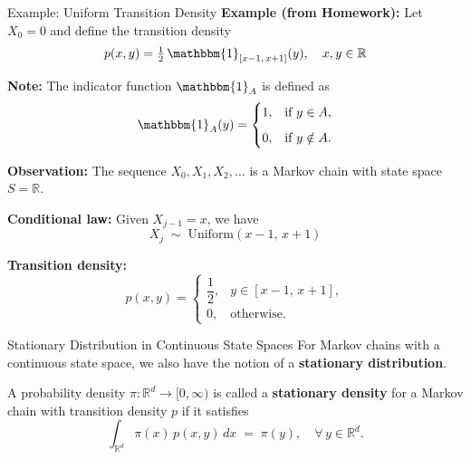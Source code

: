 \documentclass[8pt]{beamer}
\begin{document}
\begin{frame}{Example: Uniform Transition Density}
\textbf{Example (from Homework):}  
Let $X_0 = 0$ and define the transition density
\begin{equation*}
p(x,y) = \tfrac{1}{2} \, \mathbbm{1}_{[x-1,\,x+1]}(y), 
\quad x,y \in \mathbb{R}
\end{equation*}

\vspace{3mm}

\textbf{Note:} The indicator function $\mathbbm{1}_A$ is defined as
\begin{equation*}
\mathbbm{1}_A(y) =
\begin{cases}
1, & \text{if } y \in A, \\[2mm]
0, & \text{if } y \notin A.
\end{cases}
\end{equation*}

\textbf{Observation:}  
The sequence $X_0, X_1, X_2, \ldots$ is a Markov chain with state space $S=\mathbb{R}$.

\textbf{Conditional law:}  
Given $X_{j-1} = x$, we have
\begin{equation*}
X_j \;\sim\; \text{Uniform}(x-1, \, x+1)
\end{equation*}

\textbf{Transition density:}
\begin{equation*}
p(x,y) =
\begin{cases}
\dfrac{1}{2}, & y \in [x-1,\,x+1], \\[2mm]
0, & \text{otherwise}.
\end{cases}
\end{equation*}
\end{frame}


\begin{frame}{Stationary Distribution in Continuous State Spaces}
For Markov chains with a continuous state space, we also have the notion of a 
\textbf{stationary distribution}.

\vspace{3mm}

A probability density $\pi: \mathbb{R}^d \to [0,\infty)$ is called a 
\textbf{stationary density} for a Markov chain with transition density $p$ if it satisfies
\[
\int_{\mathbb{R}^d} \pi(x)\,p(x,y)\,dx \;=\; \pi(y),
\quad \forall \, y \in \mathbb{R}^d.
\]

\end{frame}
\end{document}
